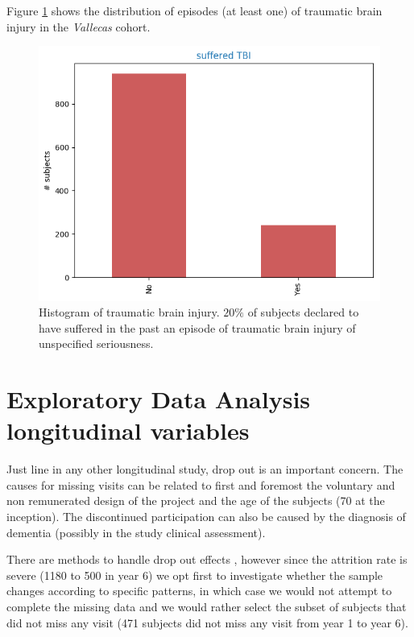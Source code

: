 \documentclass[11pt]{article}
\theoremstyle{definition}
\theoremstyle{remark}
\begin{document}
Figure \ref{fig:tce} shows the distribution of episodes (at least one) of traumatic brain injury in the \emph{Vallecas} cohort. 

\begin{figure}[H]
        \centering
        \includegraphics[keepaspectratio, width=0.6\linewidth]{figures/Fig_tce}
        \caption{Histogram of traumatic brain injury. $20\%$ of subjects declared to have suffered in the past an episode of traumatic brain injury of unspecified seriousness.} 
        \label{fig:tce}
\end{figure}

\section{Exploratory Data Analysis longitudinal variables}
\label{se:eda_long}

Just line in any other longitudinal study, drop out is an important concern. The causes for missing visits can be related to first and foremost the voluntary and non remunerated design of the project and the age of the subjects (70 at the inception). The discontinued participation can also be caused by the diagnosis of dementia (possibly in the study clinical assessment).

There are methods to handle drop out effects \cite{hogan2004handling}, however since the attrition rate is severe (1180 to 500 in year 6) we opt first to investigate whether the sample changes according to specific patterns, in which case we would not attempt to complete the missing data and we would rather select the subset of subjects that did not miss any visit (471 subjects did not miss any visit from year 1 to year 6).
\end{document}
